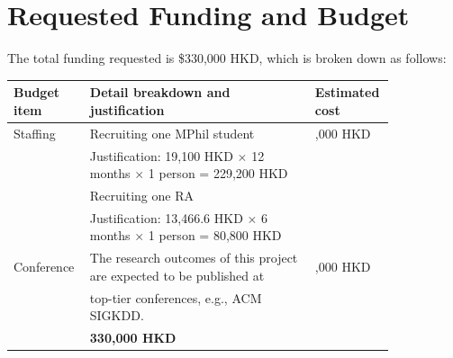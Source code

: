\documentclass[12pt,a4paper]{article}
\begin{document}
\vspace{-10pt}
\section{Requested Funding and Budget}
\vspace{-10pt}
The total funding requested is \$330,000 HKD, which is broken down as follows:
\vspace{-6pt}
\begin{center}
\footnotesize
\begin{tabular}{|>{\raggedright\arraybackslash}p{0.15\linewidth}|>{\raggedright\arraybackslash}p{0.56\linewidth}|>{\raggedright\arraybackslash}p{0.13\linewidth}|}
\hline
\textbf{Budget item} & \textbf{Detail breakdown and justification} & \textbf{Estimated cost} \\
\hline
Staffing & Recruiting one MPhil student & 310,000 HKD\\
& Justification: 19,100 HKD $\times$ 12 months $\times$ 1 person = 229,200 HKD & \\
& Recruiting one RA & \\
& Justification: 13,466.6 HKD $\times$ 6 months $\times$ 1 person = 80,800 HKD & \\
\hline
Conference & The research outcomes of this project are expected to be published at & 20,000 HKD \\
& top-tier conferences, e.g., ACM SIGKDD. & \\
\hline
\multicolumn{2}{|r|}{\textbf{Total}}   & \textbf{330,000 HKD} \\
\hline
\end{tabular}
\normalsize
\vspace{-12pt}
\end{center}

\let\oldbibliography\thebibliography
\renewcommand{\thebibliography}[1]{%
  \oldbibliography{#1}%
  \setlength{\itemsep}{-5pt}%
}


\end{document}
